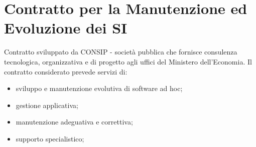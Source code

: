 \documentclass{article}
\begin{document}
\begingroup
    \hypersetup{linkbordercolor=white, linkcolor=black} 
    \tableofcontents
    \newpage
\endgroup

\section{Contratto per la Manutenzione ed Evoluzione dei SI}\label{sec:contratto_per_la_manutenzione_ed_evoluzione_dei_si} %
Contratto sviluppato da CONSIP - società pubblica che fornisce consulenza tecnologica, organizzativa e di progetto agli uffici del Ministero dell'Economia.
\emptyln{}
Il contratto considerato prevede servizi di:
\begin{itemize}
    \item sviluppo e manutenzione evolutiva di software ad hoc;
    \item gestione applicativa;
    \item manutenzione adeguativa e correttiva;
    \item supporto specialistico;
\end{itemize}
\end{document}
